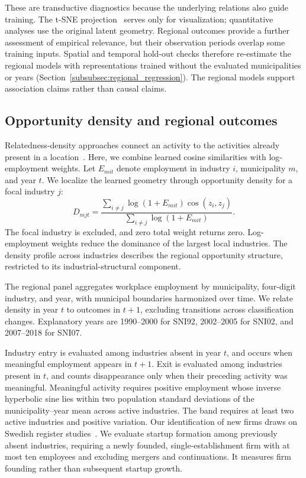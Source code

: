 \documentclass[9pt,twocolumn,twoside]{pnas-new}
\begin{document}
These are transductive diagnostics because the underlying relations also guide training. The t-SNE projection~\cite{JMLR:v9:vandermaaten08a} serves only for visualization; quantitative analyses use the original latent geometry. Regional outcomes provide a further assessment of empirical relevance, but their observation periods overlap some training inputs. Spatial and temporal hold-out checks therefore re-estimate the regional models with representations trained without the evaluated municipalities or years (Section~\ref{subsubsec:regional_regression}). The regional models support association claims rather than causal claims.

\subsection{Opportunity density and regional outcomes}
\label{subsubsec:regional_opportunity_density}

Relatedness-density approaches connect an activity to the activities already present in a location~\cite{hidalgoProductSpaceConditions2007,neffkeHowRegionsDiversify2011}. Here, we combine learned cosine similarities with log-employment weights. Let $E_{mit}$ denote employment in industry $i$, municipality $m$, and year $t$. We localize the learned geometry through opportunity density for a focal industry $j$:
\begin{equation}
D_{mjt}=\frac{\sum_{i\ne j}\log(1+E_{mit})\cos(z_i,z_j)}{\sum_{i\ne j}\log(1+E_{mit})}.
\label{eq:opportunity-density}
\end{equation}
The focal industry is excluded, and zero total weight returns zero. Log-employment weights reduce the dominance of the largest local industries. The density profile across industries describes the regional opportunity structure, restricted to its industrial-structural component.

The regional panel aggregates workplace employment by municipality, four-digit industry, and year, with municipal boundaries harmonized over time. We relate density in year $t$ to outcomes in $t+1$, excluding transitions across classification changes. Explanatory years are 1990--2000 for SNI92, 2002--2005 for SNI02, and 2007--2018 for SNI07.

Industry entry is evaluated among industries absent in year $t$, and occurs when meaningful employment appears in $t+1$. Exit is evaluated among industries present in $t$, and counts disappearance only when their preceding activity was meaningful. Meaningful activity requires positive employment whose inverse hyperbolic sine lies within two population standard deviations of the municipality--year mean across active industries. The band requires at least two active industries and positive variation. Our identification of new firms draws on Swedish register studies~\cite{anderssonCharacteristicsPerformanceNew2013,grillitschDoesTimingIntegrating2021}. We evaluate startup formation among previously absent industries, requiring a newly founded, single-establishment firm with at most ten employees and excluding mergers and continuations. It measures firm founding rather than subsequent startup growth.
\end{document}
